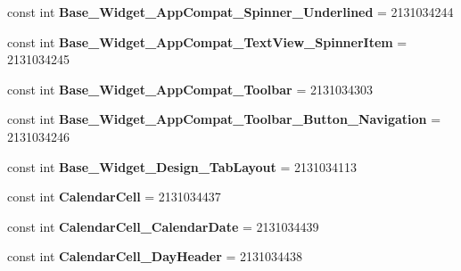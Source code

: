 \begin{DoxyCompactItemize}
\item 
\hypertarget{classClient_1_1Droid_1_1Resource_1_1Style_a63b6efe3ab3f168f66b4f18f32ec8e74}{}const int {\bfseries Base\+\_\+\+Widget\+\_\+\+App\+Compat\+\_\+\+Spinner\+\_\+\+Underlined} = 2131034244\label{classClient_1_1Droid_1_1Resource_1_1Style_a63b6efe3ab3f168f66b4f18f32ec8e74}

\item 
\hypertarget{classClient_1_1Droid_1_1Resource_1_1Style_aed7b0c1cba3c1f1f9b31413ba58f4680}{}const int {\bfseries Base\+\_\+\+Widget\+\_\+\+App\+Compat\+\_\+\+Text\+View\+\_\+\+Spinner\+Item} = 2131034245\label{classClient_1_1Droid_1_1Resource_1_1Style_aed7b0c1cba3c1f1f9b31413ba58f4680}

\item 
\hypertarget{classClient_1_1Droid_1_1Resource_1_1Style_a25ddd887adc276cac29f913bd944de42}{}const int {\bfseries Base\+\_\+\+Widget\+\_\+\+App\+Compat\+\_\+\+Toolbar} = 2131034303\label{classClient_1_1Droid_1_1Resource_1_1Style_a25ddd887adc276cac29f913bd944de42}

\item 
\hypertarget{classClient_1_1Droid_1_1Resource_1_1Style_aad6803722496732d3dbc4047aa115127}{}const int {\bfseries Base\+\_\+\+Widget\+\_\+\+App\+Compat\+\_\+\+Toolbar\+\_\+\+Button\+\_\+\+Navigation} = 2131034246\label{classClient_1_1Droid_1_1Resource_1_1Style_aad6803722496732d3dbc4047aa115127}

\item 
\hypertarget{classClient_1_1Droid_1_1Resource_1_1Style_a126d78b5570f05b17610d302cb8c00ed}{}const int {\bfseries Base\+\_\+\+Widget\+\_\+\+Design\+\_\+\+Tab\+Layout} = 2131034113\label{classClient_1_1Droid_1_1Resource_1_1Style_a126d78b5570f05b17610d302cb8c00ed}

\item 
\hypertarget{classClient_1_1Droid_1_1Resource_1_1Style_a0bbf41164e483e29293eb1ed9189570d}{}const int {\bfseries Calendar\+Cell} = 2131034437\label{classClient_1_1Droid_1_1Resource_1_1Style_a0bbf41164e483e29293eb1ed9189570d}

\item 
\hypertarget{classClient_1_1Droid_1_1Resource_1_1Style_a1d3effad5c3404a3be71cdb37fb81295}{}const int {\bfseries Calendar\+Cell\+\_\+\+Calendar\+Date} = 2131034439\label{classClient_1_1Droid_1_1Resource_1_1Style_a1d3effad5c3404a3be71cdb37fb81295}

\item 
\hypertarget{classClient_1_1Droid_1_1Resource_1_1Style_aa64256d587478f7d2a8ef5f697032592}{}const int {\bfseries Calendar\+Cell\+\_\+\+Day\+Header} = 2131034438\label{classClient_1_1Droid_1_1Resource_1_1Style_aa64256d587478f7d2a8ef5f697032592}


\end{DoxyCompactItemize}
